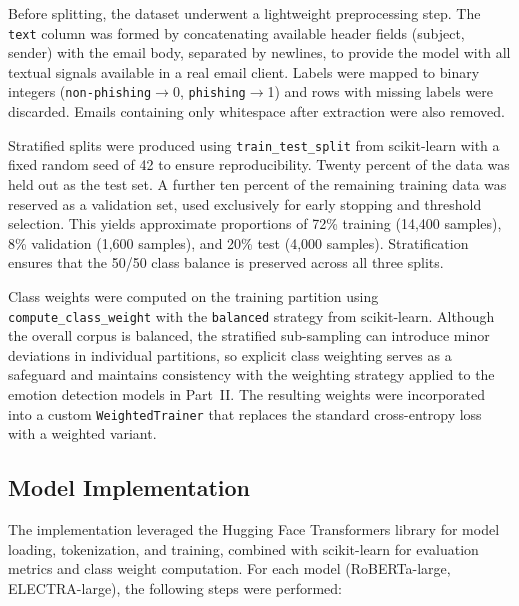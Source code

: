 Before splitting, the dataset underwent a lightweight preprocessing step. The \texttt{text} column was formed by concatenating available header fields (subject, sender) with the email body, separated by newlines, to provide the model with all textual signals available in a real email client. Labels were mapped to binary integers (\texttt{non-phishing}$\to$0, \texttt{phishing}$\to$1) and rows with missing labels were discarded. Emails containing only whitespace after extraction were also removed.

Stratified splits were produced using \texttt{train\_test\_split} from scikit-learn \cite{pedregosa2011scikit} with a fixed random seed of 42 to ensure reproducibility. Twenty percent of the data was held out as the test set. A further ten percent of the remaining training data was reserved as a validation set, used exclusively for early stopping and threshold selection. This yields approximate proportions of 72\% training (14,400 samples), 8\% validation (1,600 samples), and 20\% test (4,000 samples). Stratification ensures that the 50/50 class balance is preserved across all three splits.

Class weights were computed on the training partition using \texttt{compute\_class\_weight} with the \texttt{balanced} strategy from scikit-learn. Although the overall corpus is balanced, the stratified sub-sampling can introduce minor deviations in individual partitions, so explicit class weighting serves as a safeguard and maintains consistency with the weighting strategy applied to the emotion detection models in Part~II. The resulting weights were incorporated into a custom \texttt{WeightedTrainer} that replaces the standard cross-entropy loss with a weighted variant.

\subsection{Model Implementation}

The implementation leveraged the Hugging Face Transformers library \cite{wolf2020transformers} for model loading, tokenization, and training, combined with scikit-learn \cite{pedregosa2011scikit} for evaluation metrics and class weight computation. For each model (\acs{RoBERTa}-large, \acs{ELECTRA}-large), the following steps were performed:


